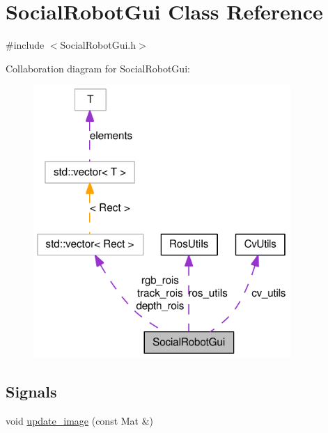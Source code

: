 \hypertarget{classSocialRobotGui}{
\section{SocialRobotGui Class Reference}
\label{classSocialRobotGui}
}


{\ttfamily \#include $<$SocialRobotGui.h$>$}



Collaboration diagram for SocialRobotGui:\nopagebreak
\begin{figure}[H]
\begin{center}
\leavevmode
\includegraphics[width=277pt]{classSocialRobotGui__coll__graph}
\end{center}
\end{figure}
\subsection*{Signals}
\begin{DoxyCompactItemize}
\item 
void \hyperlink{classSocialRobotGui_aba07bb0bb3b8fa3f317539e9d6698aee}{update\_\-image} (const Mat \&)
\end{DoxyCompactItemize}
